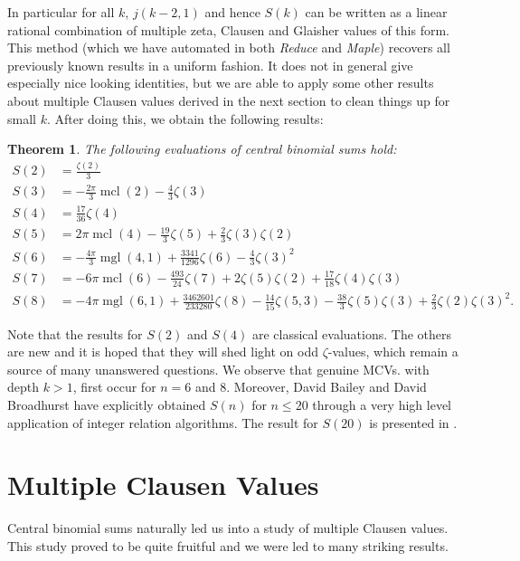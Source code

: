 \documentclass[a4paper,a4paper]{article}
\newtheorem{Thm}{Theorem}
\newcommand{\mcl}{\operatorname{mcl}}
\newcommand{\mgl}{\operatorname{mgl}}
\begin{document}
In particular for all $ k $, $ j(k-2, 1) $ and hence $ S(k) $ can be
 written as a linear rational combination of multiple zeta, Clausen and Glaisher
  values of this form.
   This method (which we have automated in both {\em Reduce} and {\em Maple})
    recovers all previously known results in a uniform fashion.
    It does not in general give especially nice looking identities,
    but we are able to apply some other results about multiple Clausen values
    derived in the next section to clean things up for small $ k $.
     After doing this, we obtain the following results:

\begin{Thm} The following evaluations of central binomial sums hold:
\begin{align*}
S(2) &= \frac{\zeta(2)}{3}  \\
S(3) &= - \frac{2\pi}{3} \mcl(2) - \frac{4}{3} \zeta(3) \\
S(4) &= \frac{17}{36} \zeta(4) \\
S(5) &= 2 \pi \mcl(4) - \frac{19}{3}\zeta(5) + \frac{2}{3}\zeta(3)\zeta(2) \\
S(6) &= - \frac{4\pi}{3} \mgl(4,1) + \frac{3341}{1296}\zeta(6)
-       \frac{4}{3}\zeta(3)^2 \\
S(7) &= -6 \pi \mcl(6) - \frac{493}{24}\zeta(7) + 2\zeta(5)\zeta(2)
+ \frac{17}{18}\zeta(4)\zeta(3) \\
S(8) &= -4 \pi \mgl(6,1) + \frac{3462601}{233280}\zeta(8) -
\frac{14}{15}\zeta(5,3) -
\frac{38}{3}\zeta(5)\zeta(3) + \frac{2}{3}\zeta(2)\zeta(3)^2.
\end{align*}
\end{Thm}

Note that the results for $ S(2) $ and $ S(4) $ are classical evaluations.
The others are  new and it is hoped that they will shed light on odd
$\zeta$-values, which remain a  source of many unanswered questions. We
observe that genuine MCVs. with depth $k>1$,   first occur for $n=6$ and
8.  Moreover, David Bailey and David Broadhurst have explicitly
obtained $S(n)$ for $n\leq20$ through   a very high level application of
integer relation algorithms. The result for $S(20)$ is presented in
\cite{DHJB1}.


\section{Multiple Clausen Values}

Central binomial sums naturally led us into a study of multiple Clausen values.
 This study proved to be quite fruitful and we were led to many
  striking results.
\end{document}
